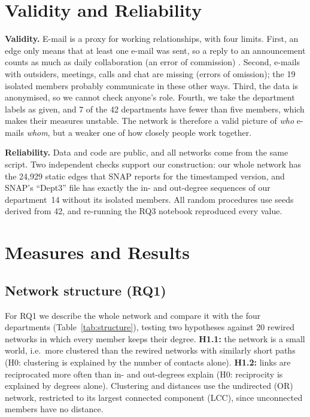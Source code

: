 \documentclass[12pt, a4paper]{article}
\begin{document}
\section{Validity and Reliability}
\label{validity}

\textbf{Validity.} E-mail is a proxy for working relationships, with four
limits. First, an edge only means that at least one e-mail was sent, so a reply
to an announcement counts as much as daily collaboration (an error of
commission) \cite{borgatti2018}. Second, e-mails with outsiders, meetings,
calls and chat are missing (errors of omission); the 19 isolated members
probably communicate in these other ways. Third, the data is anonymised, so we
cannot check anyone's role. Fourth, we take the department labels as given,
and 7 of the 42 departments have fewer than five members, which makes their
measures unstable. The network is therefore a valid picture of \emph{who}
e-mails \emph{whom}, but a weaker one of how closely people work together.

\textbf{Reliability.} Data and code are public, and all networks come from the
same script. Two independent checks support our construction: our whole
network has the 24{,}929 static edges that SNAP reports for the timestamped
version, and SNAP's ``Dept3'' file has exactly the in- and out-degree
sequences of our department~14 without its isolated members. All random
procedures use seeds derived from 42, and re-running the RQ3 notebook
reproduced every value.

\section{Measures and Results}
\label{measures}

\subsection{Network structure (RQ1)}
\label{sec:structure}

For RQ1 we describe the whole network and compare it with the four departments
(Table~\ref{tab:structure}), testing two hypotheses against 20 rewired networks
in which every member keeps their degree. \textbf{H1.1:} the network is a small
world, i.e.\ more clustered than the rewired networks with similarly short
paths (H0: clustering is explained by the number of contacts alone).
\textbf{H1.2:} links are reciprocated more often than in- and out-degrees
explain (H0: reciprocity is explained by degrees alone). Clustering and
distances use the undirected (OR) network, restricted to its largest connected
component (LCC), since unconnected members have no distance.
\end{document}

